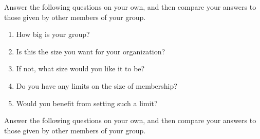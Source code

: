 
Answer the following questions on your own, and then compare your
answers to those given by other members of your group.

\begin{enumerate}

\item
  How big is your group?

\item
  Is this the size you want for your organization?

\item
  If not, what size would you like it to be?

\item
  Do you have any limits on the size of membership?

\item
  Would you benefit from setting such a limit?

\end{enumerate}


Answer the following questions on your own, and then compare your
answers to those given by other members of your group.

